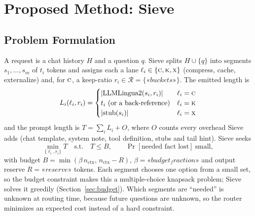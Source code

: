 \documentclass[journal]{IEEEtran}
\begin{document}
\section{Proposed Method: Sieve}\label{sec:method}
\subsection{Problem Formulation}
A request is a chat history $H$ and a question $q$. Sieve splits $H\cup\{q\}$ into segments $s_1,\dots,s_m$ of $t_i$ tokens and assigns
each a lane $\ell_i\in\{\textsc{c},\textsc{k},\textsc{x}\}$ (compress, cache, externalize) and, for $\textsc{c}$, a keep-ratio
$r_i\in\mathcal{R}=\{«buckets»\}$. The emitted length is
\begin{equation}
L_i(\ell_i,r_i)=\begin{cases}|\mathrm{LLMLingua2}(s_i,r_i)| & \ell_i=\textsc{c}\\ t_i\ \text{(or a back-reference)} & \ell_i=\textsc{k}\\ |\mathrm{stub}(s_i)| & \ell_i=\textsc{x}\end{cases}
\end{equation}
and the prompt length is $T=\sum_i L_i+O$, where $O$ counts every overhead Sieve adds (chat template, system note, tool definition,
stubs and tail hint). Sieve seeks
\begin{equation}
\min_{\{\ell_i,r_i\}} T\quad\text{s.t.}\quad T\le B,\qquad \Pr[\text{needed fact lost}]\ \text{small},
\label{eq:obj}
\end{equation}
with budget $B=\min(\beta\,n_\text{ctx},\,n_\text{ctx}-R)$, $\beta=«budget_fraction»$ and output reserve $R=«reserve»$ tokens. Each
segment chooses one option from a small set, so the budget constraint makes this a multiple-choice knapsack problem; Sieve solves it
greedily (Section~\ref{sec:budget}). Which segments are ``needed'' is unknown at routing time, because future questions are unknown,
so the router minimizes an expected cost instead of a hard constraint.
\end{document}
